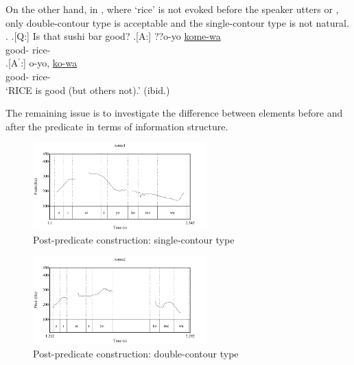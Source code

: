 On the other hand,
in \Next, where `rice' is not evoked before the speaker utters \Next[A] or \Next[A$^{\prime}$],
only double-contour type \Next[A$^{\prime}$] is acceptable
and the single-contour type \Next[A] is not natural.
\ex. 
 \a.[Q:] Is that sushi bar good?
	\bg.[A:] ??o-yo \ul{kome-wa} \\
			good- rice- \\
	\bg.[A$^{\prime}$:] o-yo, \ul{ko-wa} \\
			good- rice- \\
			`RICE is good (but others not).'
			\hfill{(ibid.)}

The remaining issue is
to investigate the difference between elements before and after the predicate in terms of information structure.

\begin{figure}
	\begin{center}
	\includegraphics[width=0.6\textwidth]{sounds/kome1.pdf}
	\caption{Post-predicate construction: single-contour type}
	\label{kome1F}
	\end{center}
\end{figure}
\begin{figure}
	\begin{center}
	\includegraphics[width=0.6\textwidth]{sounds/kome2.pdf}
	\caption{Post-predicate construction: double-contour type}
	\label{kome2F}
	\end{center}
\end{figure}

